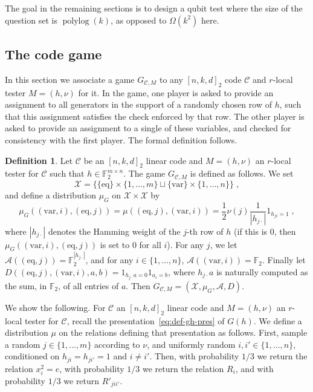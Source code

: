 \documentclass[11pt]{article}
\theoremstyle{definition}
\newtheorem{definition}[theorem]{Definition}
\newcommand{\code}{\mathscr{C}}
\newcommand{\F}{\ensuremath{\mathbb{F}}}
\newcommand{\mA}{\ensuremath{\mathcal{A}}}
\newcommand{\mX}{\ensuremath{\mathcal{X}}}
\DeclareMathOperator{\polylog}{polylog}
\newcommand{\eq}{\mathrm{eq}}
\newcommand{\var}{\mathrm{var}}
\begin{document}
The goal in the remaining sections is to design a qubit test where the size of the question set is $\polylog(k)$, as opposed to $\Omega(k^2)$ here. 

\subsection{The code game}
\label{sec:code-game}

In this section we associate a game $G_{\code,M}$ to any $[n,k,d]_2$ code $\code$ and $r$-local tester $M=(h,\nu)$ for it. In the game, one player is asked to provide an assignment to all generators in the support of a randomly chosen row of $h$, such that this assignment satisfies the check enforced by that row. The other player is asked to provide an assignment to a single of these variables, and checked for consistency with the first player. The formal definition follows.  

\begin{definition}
Let $\code$ be an $[n,k,d]_2$ linear code and $M=(h,\nu)$ an $r$-local tester for $\code$ such that $h\in \F_2^{m\times n}$. The game $G_{\code,M}$ is defined as follows. We set 
\[\mX = \big\{ \{\eq\}\times\{1,\ldots,m\} \sqcup\{\var\}\times \{1,\ldots,n\}\big\}\;,\]
and define a distribution $\mu_G$ on $\mX \times \mX$ by 
\[\mu_G((\var,i),(\eq,j))=\mu((\eq,j),(\var,i)) = \frac{1}{2}\nu(j)\frac{1}{|h_{j\cdot}|} 1_{h_{ji}=1}\;,\]
where $|h_{j\cdot}|$ denotes the Hamming weight of the $j$-th row of $h$ (if this is $0$, then $\mu_G((\var,i),(\eq,j))$ is set to $0$ for all $i$). For any $j$, we let $\mA((\eq,j))=\F_2^{|h_{j\cdot}|}$, and for any $i\in\{1,\ldots,n\}$, $\mA((\var,i))=\F_2$. Finally let $D((\eq,j),(\var,i),a,b)=1_{h_{j\cdot} a=0} 1_{a_i=b}$, where $h_{j\cdot}a$ is naturally computed as the sum, in $\F_2$, of all entries of $a$.  Then $G_{\code,M}=(\mX,\mu_G,\mA,D)$. 
\end{definition}

We show the following. For $\code$ an $[n,k,d]_2$ linear code and $M=(h,\nu)$ an $r$-local tester for $\code$, recall the presentation~\eqref{eq:def-gh-pres} of $G(h)$. We define a distribution $\mu$ on the relations defining that presentation as follows. First, sample a random $j\in\{1,\ldots,m\}$ according to $\nu$, and uniformly random $i,i'\in\{1,\ldots,n\}$, conditioned on $h_{ji}=h_{ji'}=1$ and $i\neq i'$. Then, with probability $1/3$ we return the relation $x_i^2=e$, with probability $1/3$ we return the relation $R_i$, and with probability $1/3$ we return $R'_{jii'}$. 
\end{document}
